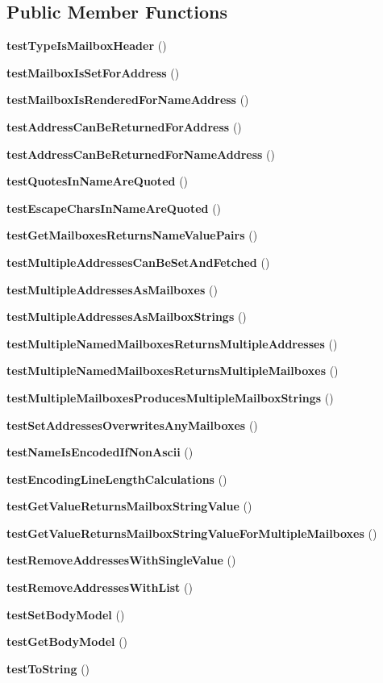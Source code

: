 \subsection*{Public Member Functions}
\begin{DoxyCompactItemize}
\item 
{\bf test\+Type\+Is\+Mailbox\+Header} ()
\item 
{\bf test\+Mailbox\+Is\+Set\+For\+Address} ()
\item 
{\bf test\+Mailbox\+Is\+Rendered\+For\+Name\+Address} ()
\item 
{\bf test\+Address\+Can\+Be\+Returned\+For\+Address} ()
\item 
{\bf test\+Address\+Can\+Be\+Returned\+For\+Name\+Address} ()
\item 
{\bf test\+Quotes\+In\+Name\+Are\+Quoted} ()
\item 
{\bf test\+Escape\+Chars\+In\+Name\+Are\+Quoted} ()
\item 
{\bf test\+Get\+Mailboxes\+Returns\+Name\+Value\+Pairs} ()
\item 
{\bf test\+Multiple\+Addresses\+Can\+Be\+Set\+And\+Fetched} ()
\item 
{\bf test\+Multiple\+Addresses\+As\+Mailboxes} ()
\item 
{\bf test\+Multiple\+Addresses\+As\+Mailbox\+Strings} ()
\item 
{\bf test\+Multiple\+Named\+Mailboxes\+Returns\+Multiple\+Addresses} ()
\item 
{\bf test\+Multiple\+Named\+Mailboxes\+Returns\+Multiple\+Mailboxes} ()
\item 
{\bf test\+Multiple\+Mailboxes\+Produces\+Multiple\+Mailbox\+Strings} ()
\item 
{\bf test\+Set\+Addresses\+Overwrites\+Any\+Mailboxes} ()
\item 
{\bf test\+Name\+Is\+Encoded\+If\+Non\+Ascii} ()
\item 
{\bf test\+Encoding\+Line\+Length\+Calculations} ()
\item 
{\bf test\+Get\+Value\+Returns\+Mailbox\+String\+Value} ()
\item 
{\bf test\+Get\+Value\+Returns\+Mailbox\+String\+Value\+For\+Multiple\+Mailboxes} ()
\item 
{\bf test\+Remove\+Addresses\+With\+Single\+Value} ()
\item 
{\bf test\+Remove\+Addresses\+With\+List} ()
\item 
{\bf test\+Set\+Body\+Model} ()
\item 
{\bf test\+Get\+Body\+Model} ()
\item 
{\bf test\+To\+String} ()
\end{DoxyCompactItemize}
